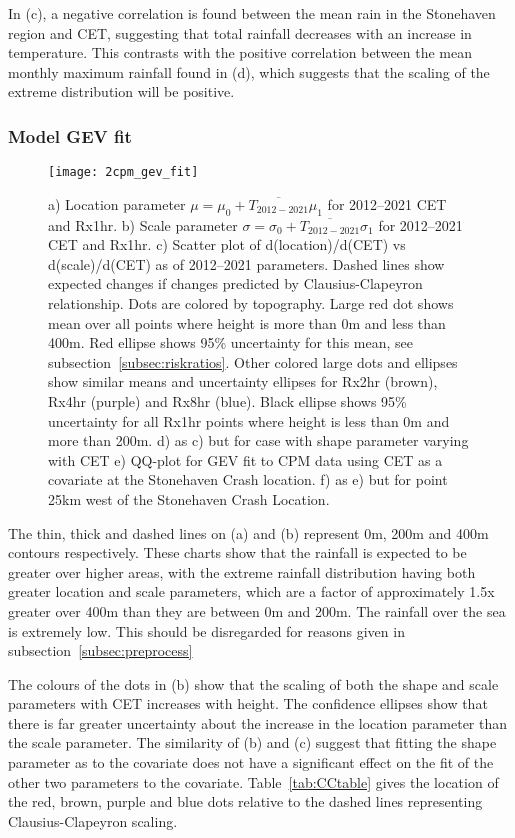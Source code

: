 In (c),
    a negative correlation is found between the mean rain in the Stonehaven region and CET,
    suggesting that total rainfall decreases with an increase in temperature.
This contrasts with the positive correlation between the mean monthly maximum rainfall found in (d),
    which suggests that the scaling of the extreme distribution will be positive.

\subsubsection{Model GEV fit}

\begin{figure}[H]
    \centering
    \texttt{[image: 2cpm\_gev\_fit]}
    \caption{a) Location parameter $\mu = \mu_0 + \overline{T_{2012-2021}}\mu_1$  for 2012--2021 CET and Rx1hr.
    b) Scale parameter $\sigma = \sigma_0 + \overline{T_{2012-2021}}\sigma_1$ for 2012--2021 CET and Rx1hr.
    c) Scatter plot of d(location)/d(CET) vs d(scale)/d(CET) as of 2012--2021 parameters.
    Dashed lines show expected changes if changes predicted by Clausius-Clapeyron relationship.
    Dots are colored by topography.
    Large red dot shows mean over all points where height is more than 0m and less than 400m.
    Red ellipse shows 95\% uncertainty for this mean, see subsection~\ref{subsec:riskratios}.
    Other colored large dots and ellipses show similar means and uncertainty ellipses for Rx2hr (brown), Rx4hr (purple) and Rx8hr (blue).
    Black ellipse shows 95\% uncertainty for all Rx1hr points where height is less than 0m and more than 200m.
    d) as c) but for case with shape parameter varying with CET
    e) QQ-plot for GEV fit to CPM data using CET as a covariate at the Stonehaven Crash location.
    f) as e) but for point 25km west of the Stonehaven Crash Location.}
    \label{fig:2cpm_gev_fit}
\end{figure}

The thin, thick and dashed lines on (a) and (b) represent 0m, 200m and 400m contours respectively.
These charts show that the rainfall is expected to be greater over higher areas,
    with the extreme rainfall distribution having both greater location and scale parameters,
    which are a factor of approximately 1.5x greater over 400m than they are between 0m and 200m.
The rainfall over the sea is extremely low.
This should be disregarded for reasons given in subsection~\ref{subsec:preprocess}

The colours of the dots in (b) show that the scaling of both the shape and scale parameters with CET
    increases with height.
The confidence ellipses show that there is far greater uncertainty about the increase in the location parameter
    than the scale parameter.
The similarity of (b) and (c) suggest that fitting the shape parameter as to the covariate does not have
    a significant effect on the fit of the other two parameters to the covariate.
Table~\ref{tab:CCtable} gives the location of the red, brown, purple and blue dots relative to the
    dashed lines representing Clausius-Clapeyron scaling.

